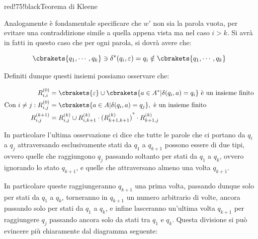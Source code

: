\begin{halfframedbox}{red!75!black}{Teorema di Kleene}
\begin{itemize}
    Analogamente è fondamentale specificare che \(w'\) non sia la parola vuota, per evitare una contraddizione simile a quella appena vista ma nel caso \(i>k\). Si avrà in fatti in questo caso che per ogni parola, si dovrà avere che:

    \begin{equation}
      \cbrakets{q_1, \cdots, q_k} \ni \delta^*(q_i,\varepsilon) = q_i \notin \cbrakets{q_1, \cdots, q_k}
    \end{equation}

    Definiti dunque questi insiemi possiamo osservare che:

    \begin{equation}
      \begin{split}
        R^{(0)}_{i,i}&=\cbrakets{\varepsilon} \cup \cbrakets{a \in A^* \vert \delta(q_i, a) = q_i} \text{ è un insieme finito}\\
        \text{Con } i \neq j: R^{(0)}_{i,j}&=\cbrakets{a \in A \vert \delta(q_i, a) = q_j}, \text{ è un insieme finito} \\
        R^{(k+1)}_{i,j}&=R^{(k)}_{i,j} \cup R^{(k)}_{i,k+1}\cdot {(R^{(k)}_{k+1,k+1})}^* \cdot R^{(k)}_{k+1,j}
      \end{split}
    \end{equation}


  In particolare l'ultima osservazione ci dice che tutte le parole che ci portano da \(q_i\) a \(q_j\) attraversando esclusivamente stati da \(q_1\) a \(q_{k+1}\) possono essere di due tipi, ovvero quelle che raggiungono \(q_j\) passando soltanto per stati da \(q_1\) a \(q_k\), ovvero ignorando lo stato \(q_{k+1}\), e quelle che attraversano almeno una volta \(q_{k+1}\).

  In particolare queste raggiungeranno \(q_{k+1}\) una prima volta, passando dunque solo per stati da \(q_1\) a \(q_k\), torneranno in \(q_{k+1}\) un numero arbitrario di volte, ancora passando solo per stati da \(q_1\) a \(q_k\), e infine lasceranno un'ultima volta \(q_{k+1}\) per raggiungere \(q_j\) passando ancora solo da stati tra \(q_1\) e \(q_k\). Questa divisione si può evincere più chiaramente dal diagramma seguente:

  \medskip
  \begin{center}
\end{center}
\end{itemize}
\end{halfframedbox}
